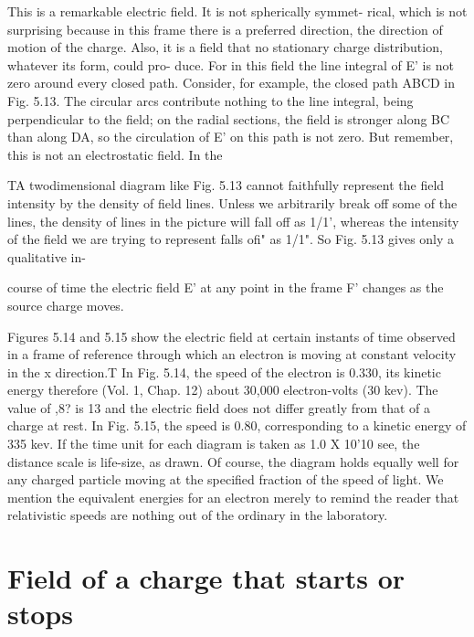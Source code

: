 This is a remarkable electric field. It is not spherically symmet-
rical, which is not surprising because in this frame there is a preferred
direction, the direction of motion of the charge. Also, it is a field
that no stationary charge distribution, whatever its form, could pro-
duce. For in this field the line integral of E' is not zero around every
closed path. Consider, for example, the closed path ABCD in
Fig. 5.13. The circular arcs contribute nothing to the line integral,
being perpendicular to the field; on the radial sections, the field is
stronger along BC than along DA, so the circulation of E' on this path
is not zero. But remember, this is not an electrostatic field. In the

TA twodimensional diagram like Fig. 5.13 cannot faithfully represent the field intensity
by the density of field lines. Unless we arbitrarily break off some of the lines,
the density of lines in the picture will fall off as 1/1', whereas the intensity of the field
we are trying to represent falls ofi" as 1/1". So Fig. 5.13 gives only a qualitative in-

 

course of time the electric field E' at any point in the frame F' changes
as the source charge moves.

Figures 5.14 and 5.15 show the electric field at certain instants of
time observed in a frame of reference through which an electron is
moving at constant velocity in the x direction.T In Fig. 5.14, the
speed of the electron is 0.330, its kinetic energy therefore (Vol. 1,
Chap. 12) about 30,000 electron-volts (30 kev). The value of ,8?
is 13 and the electric field does not differ greatly from that of a charge
at rest. In Fig. 5.15, the speed is 0.80, corresponding to a kinetic
energy of 335 kev. If the time unit for each diagram is taken as
1.0 X 10'10 see, the distance scale is life-size, as drawn. Of course,
the diagram holds equally well for any charged particle moving at
the specified fraction of the speed of light. We mention the equivalent
energies for an electron merely to remind the reader that relativistic
speeds are nothing out of the ordinary in the laboratory.

\section{Field of a charge that starts or stops}

